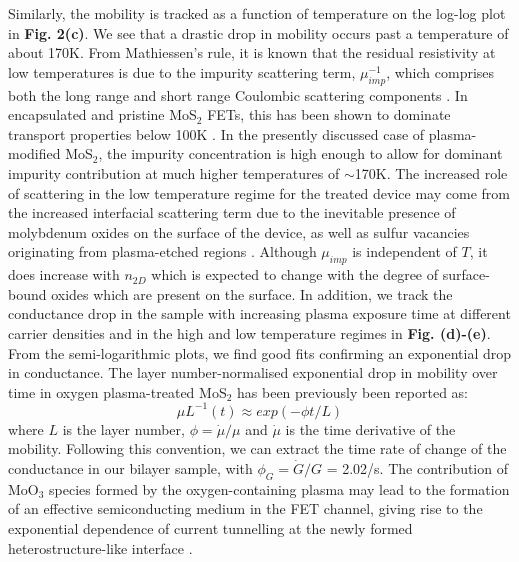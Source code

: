 \documentclass[%
 aip,
 jmp,%
 amsmath,amssymb,
 reprint,%
]{revtex4-1}
\begin{document}
\indent Similarly, the mobility is tracked as a function of temperature on the log-log plot in \textbf{Fig. 2(c)}. We see that a drastic drop in mobility occurs past a temperature of about 170K. From Mathiessen's rule, it is known that the residual resistivity at low temperatures is due to the impurity scattering term, $\mu_{imp}^{-1}$, which comprises both the long range and short range Coulombic scattering components \cite{cui2015multi}. In encapsulated and pristine MoS$_2$ FETs, this has been shown to dominate transport properties below 100K \cite{radisavljevic2013mobility, cui2015multi}. In the presently discussed case of plasma-modified MoS$_2$, the impurity concentration is high enough to allow for dominant impurity contribution at much higher temperatures of $\sim$170K. The increased role of scattering in the low temperature regime for the treated device may come from the increased interfacial scattering term due to the inevitable presence of molybdenum oxides on the surface of the device, as well as sulfur vacancies originating from plasma-etched regions \cite{ko2016stack, zhu2016remote, jadwiszczak2017oxide}. Although $\mu_{imp}$ is independent of $T$, it does increase with $n_{2D}$ which is expected to change with the degree of surface-bound oxides which are present on the surface. \newline
\indent In addition, we track the conductance drop in the sample with increasing plasma exposure time at different carrier densities and in the high and low temperature regimes in \textbf{Fig. (d)-(e)}. From the semi-logarithmic plots, we find good fits confirming an exponential drop in conductance. The layer number-normalised exponential drop in mobility over time in oxygen plasma-treated MoS$_2$ has been previously been reported \cite{khondaker2016bandgap} as: 
\begin{equation}
\mu L^{-1} (t) \approx exp(- \phi t/L) 
\end{equation} where $L$ is the layer number, $\phi = \dot{\mu}/\mu$ and $\dot{\mu}$ is the time derivative of the mobility. Following this convention, we can extract the time rate of change of the conductance in our bilayer sample, with $\phi_{G} = \dot{G}/G$ = 2.02/s. The contribution of MoO$_3$ species formed by the oxygen-containing plasma may lead to the formation of an effective semiconducting medium in the FET channel, giving rise to the exponential dependence of current tunnelling at the newly formed heterostructure-like interface \cite{khondaker2016bandgap, choudhary2016two}.
\end{document}
